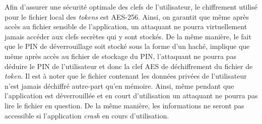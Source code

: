 Afin d'assurer une sécurité optimale des clefs de l'utilisateur, le chiffrement utilisé pour
le fichier local des \emph{tokens} est AES-256. Ainsi, on garantit que même après accès au
fichier sensible de l'application, un attaquant ne pourra virtuellement jamais accéder aux
clefs secrètes qui y sont stockés. De la même manière, le fait que le PIN de déverrouillage
soit stocké sous la forme d'un haché, implique que même après accès au fichier de stockage du
PIN, l'attaquant ne pourra pas déduire le PIN de l'utilisateur et donc la clef AES de
déchiffrement du fichier de \emph{token}. Il est à noter que le fichier contenant les données
privées de l'utilisateur n'est jamais déchiffré autre-part qu'en mémoire. Ainsi, même pendant
que l'application est déverrouillée et en court d'utilisation un attaquant ne pourra pas lire
le fichier en question. De la même manière, les informations ne seront pas accessible si 
l'application \emph{crash} en cours d'utilisation.




